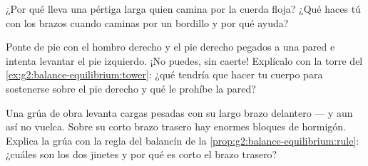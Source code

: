 \begin{exercise}[$\star$]\label{exo:g2:balance-equilibrium:8}
¿Por qué lleva una pértiga larga quien camina por la cuerda floja?
¿Qué haces tú con los brazos cuando caminas por un bordillo y por qué
ayuda?
\end{exercise}

\begin{exercise}[$\star$]\label{exo:g2:balance-equilibrium:9}
Ponte de pie con el hombro derecho y el pie derecho pegados a una
pared e intenta levantar el pie izquierdo. ¡No puedes, sin caerte!
Explícalo con la torre del \cref{ex:g2:balance-equilibrium:tower}: ¿qué
tendría que hacer tu cuerpo para sostenerse sobre el pie derecho y qué
le prohíbe la pared?
\end{exercise}

\begin{exercise}[$\star\star$]\label{exo:g2:balance-equilibrium:10}
Una grúa de obra levanta cargas pesadas con su largo brazo delantero
--- y aun así no vuelca. Sobre su corto brazo trasero hay enormes
bloques de hormigón. Explica la grúa con la regla del balancín de la
\cref{prop:g2:balance-equilibrium:rule}: ¿cuáles son los dos jinetes y
por qué es corto el brazo trasero?
\end{exercise}
